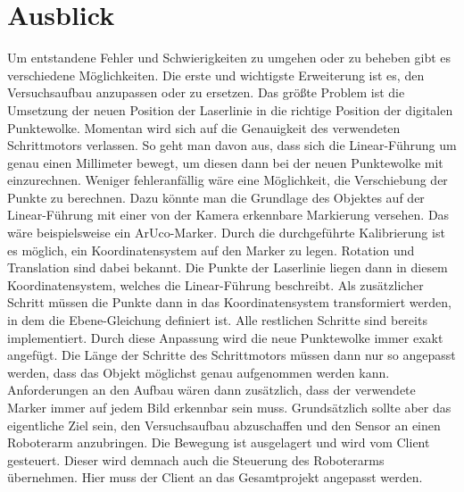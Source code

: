 \section{Ausblick}\label{ausblick}
	Um entstandene Fehler und Schwierigkeiten zu umgehen oder zu beheben gibt es verschiedene Möglichkeiten. Die erste und wichtigste Erweiterung ist es, den Versuchsaufbau anzupassen oder zu ersetzen. Das größte Problem ist die Umsetzung der neuen Position der Laserlinie in die richtige Position der digitalen Punktewolke. Momentan wird sich auf die Genauigkeit des verwendeten Schrittmotors verlassen. So geht man davon aus, dass sich die Linear-Führung um genau einen Millimeter bewegt, um diesen dann bei der neuen Punktewolke mit einzurechnen. Weniger fehleranfällig wäre eine Möglichkeit, die Verschiebung der Punkte zu berechnen. Dazu könnte man die Grundlage des Objektes auf der Linear-Führung mit einer von der Kamera erkennbare Markierung versehen. Das wäre beispielsweise ein ArUco-Marker. Durch die durchgeführte Kalibrierung ist es möglich, ein Koordinatensystem auf den Marker zu legen. Rotation und Translation sind dabei bekannt. Die Punkte der Laserlinie liegen dann in diesem Koordinatensystem, welches die Linear-Führung beschreibt. Als zusätzlicher Schritt müssen die Punkte dann in das Koordinatensystem transformiert werden, in dem die Ebene-Gleichung definiert ist. Alle restlichen Schritte sind bereits implementiert. Durch diese Anpassung wird die neue Punktewolke immer exakt angefügt. Die Länge der Schritte des Schrittmotors müssen dann nur so angepasst werden, dass das Objekt möglichst genau aufgenommen werden kann. Anforderungen an den Aufbau wären dann zusätzlich, dass der verwendete Marker immer auf jedem Bild erkennbar sein muss. \newline
	Grundsätzlich sollte aber das eigentliche Ziel sein, den Versuchsaufbau abzuschaffen und den Sensor an einen Roboterarm anzubringen. Die Bewegung ist ausgelagert und wird vom Client gesteuert. Dieser wird demnach auch die Steuerung des Roboterarms übernehmen. Hier muss der Client an das Gesamtprojekt angepasst werden. \newline

